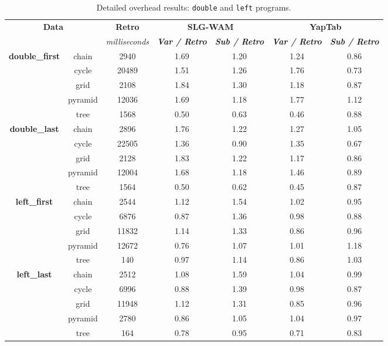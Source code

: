 \begin{table}[ht]
\centering
\footnotesize{
  \begin{tabular}{cc|c|cc|cc}
   \hline
    \hline
    \multicolumn{2}{c|}{\multirow{2}{*}{\small{\textbf{Data}}}} & \textbf{\small{Retro}} & \multicolumn{2}{c|}{\small{\textbf{SLG-WAM}}} & \multicolumn{2}{c}{\small{\textbf{YapTab}}} \\
     \multicolumn{2}{c|}{} & \scriptsize{\textit{milliseconds}} & \textbf{\textit{\scriptsize{Var / Retro}}} & \textbf{\textit{\scriptsize{Sub / Retro}}} & \textbf{\textit{\scriptsize{Var / Retro}}} & \textbf{\textit{\scriptsize{Sub / Retro}}} \\
   \hline
   \hline

\multirow{5}{*}{\textbf{double\_first}} &  chain &  2940 &  1.69  &  1.20  &  1.24 & 0.86 \\
&  cycle &  20489 &  1.51  &  1.26  &  1.76 & 0.73 \\
&  grid &  2108 &  1.84  &  1.30  &  1.18 & 0.87 \\
&  pyramid &  12036 &  1.69  &  1.18  &  1.77 & 1.12 \\
&  tree &  1568 &  0.50  &  0.63  &  0.46 & 0.88 \\
\hline
\multirow{5}{*}{\textbf{double\_last}} &  chain &  2896 &  1.76  &  1.22  &  1.27 & 1.05 \\
&  cycle &  22505 &  1.36  &  0.90  &  1.35 & 0.67 \\
&  grid &  2128 &  1.83  &  1.22  &  1.17 & 0.86 \\
&  pyramid &  12004 &  1.68  &  1.18  &  1.46 & 0.89 \\
&  tree &  1564 &  0.50  &  0.62  &  0.45 & 0.87 \\
\hline
\multirow{5}{*}{\textbf{left\_first}} &  chain &  2544 &  1.12  &  1.54  &  1.02 & 0.95 \\
&  cycle &  6876 &  0.87  &  1.36  &  0.98 & 0.88 \\
&  grid &  11832 &  1.14  &  1.33  &  0.86 & 0.96 \\
&  pyramid &  12672 &  0.76  &  1.07  &  1.01 & 1.18 \\
&  tree &  140 &  0.97  &  1.14  &  0.86 & 1.03 \\
\hline
\multirow{5}{*}{\textbf{left\_last}} &  chain &  2512 &  1.08  &  1.59  &  1.04 & 0.99 \\
&  cycle &  6996 &  0.88  &  1.39  &  0.98 & 0.87 \\
&  grid &  11948 &  1.12  &  1.31  &  0.85 & 0.96 \\
&  pyramid &  2780 &  0.86  &  1.05  &  1.04 & 0.97 \\
&  tree &  164 &  0.78  &  0.95  &  0.71 & 0.83 \\
\hline
\hline
\end{tabular}
}
\caption{Detailed overhead results: \texttt{double} and \texttt{left} programs.}
\label{tbl:overhead_detail_tst1}
\end{table}


